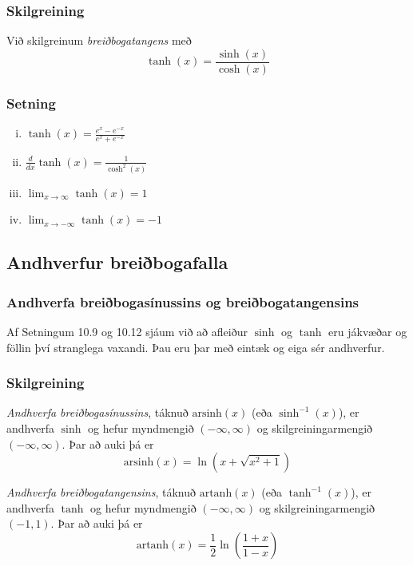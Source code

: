 \documentclass[icelandic,a4paper,12pt]{article}
\newcommand{\arsinh}{{\text{arsinh}}}
\newcommand{\artanh}{{\text{artanh}}}
\begin{document}
\subsubsection{Skilgreining}
Við skilgreinum \emph{breiðbogatangens} með 
\begin{equation*}
\tanh(x) = \frac{\sinh(x)}{\cosh(x)}
\end{equation*}
 
\subsubsection{Setning}
\begin{enumerate}[(i)]
\item $\tanh(x) = \frac{e^x-e^{-x}}{e^x+e^{-x}}$ \pause
\item $\frac d{dx} \tanh(x) = \frac{1}{\cosh^2(x)}$ \pause
\item $\lim_{x\to \infty} \tanh(x) = 1$ 
\item $\lim_{x\to -\infty} \tanh(x) = -1$
\end{enumerate}

\subsection{Andhverfur breiðbogafalla}
\subsubsection{Andhverfa breiðbogasínussins og breiðbogatangensins}
Af Setningum 10.9 og 10.12 sjáum við að afleiður $\sinh$ og
$\tanh$ eru jákvæðar og föllin því stranglega vaxandi. \pause
Þau eru þar með eintæk og eiga sér andhverfur.

\subsubsection{Skilgreining}
\emph{Andhverfa breiðbogasínussins}, táknuð $\arsinh(x)$ (eða $\sinh^{-1}(x)$), 
er andhverfa $\sinh$ og hefur myndmengið $(-\infty,\infty)$ 
og skilgreiningarmengið $(-\infty,\infty)$. Þar að auki þá er 
\begin{equation*}
\arsinh(x) = \ln\left(x+\sqrt{x^2+1}\right)
\end{equation*}
 
\emph{Andhverfa breiðbogatangensins}, táknuð $\artanh(x)$ (eða $\tanh^{-1}(x)$), 
er andhverfa $\tanh$ og hefur myndmengið $(-\infty,\infty)$ 
og skilgreiningarmengið $(-1,1)$. Þar að auki þá er 
\begin{equation*}
\artanh(x) = \frac 12 \ln\left(\frac{1+x}{1-x}\right)
\end{equation*}
\end{document}
